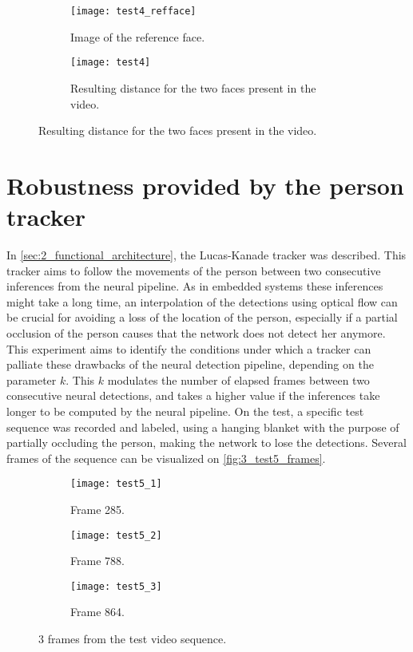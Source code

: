 \begin{figure}[h]
	\centering
	\begin{subfigure}[b]{0.25\linewidth}
		\centering
		\texttt{[image: test4\_refface]}
		\caption{Image of the reference face.}
		\label{fig:3_test4_refface}
	\end{subfigure}
	\begin{subfigure}[b]{0.7\linewidth}
		\centering
		\texttt{[image: test4]}
		\caption{Resulting distance for the two faces present in the video.}
		\label{fig:3_test4_result}
	\end{subfigure}
\end{figure}




\section{Robustness provided by the person tracker}
In \autoref{sec:2_functional_architecture}, the Lucas-Kanade tracker was described. This tracker aims to follow the movements of the person between two consecutive inferences from the neural pipeline. As in embedded systems these inferences might take a long time, an interpolation of the detections using optical flow can be crucial for avoiding a loss of the location of the person, especially if a partial occlusion of the person causes that the network does not detect her anymore.\\

This experiment aims to identify the conditions under which a tracker can palliate these drawbacks of the neural detection pipeline, depending on the parameter $k$. This $k$ modulates the number of elapsed frames between two consecutive neural detections, and takes a higher value if the inferences take longer to be computed by the neural pipeline. On the test, a specific test sequence was recorded and labeled, using a hanging blanket with the purpose of partially occluding the person, making the network to lose the detections. Several frames of the sequence can be visualized on \autoref{fig:3_test5_frames}.\\


\begin{figure}[h]
	\centering
	\begin{subfigure}[b]{0.3\linewidth}
		\centering
		\texttt{[image: test5\_1]}
		\caption{Frame 285.}
	\end{subfigure}
	\begin{subfigure}[b]{0.3\linewidth}
		\centering
		\texttt{[image: test5\_2]}
		\caption{Frame 788.}
	\end{subfigure}
	\begin{subfigure}[b]{0.3\linewidth}
		\centering
		\texttt{[image: test5\_3]}
		\caption{Frame 864.}
	\end{subfigure}
	\caption{3 frames from the test video sequence.}
	\label{fig:3_test5_frames}
\end{figure}



